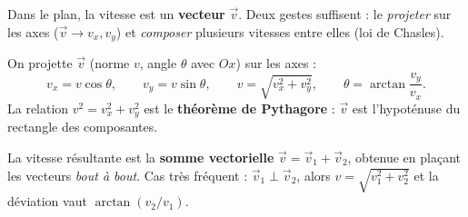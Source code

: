 \documentclass[11pt,a4paper]{article}
\newcommand{\vv}[1]{\vec{#1}}\newcommand{\ds}{\displaystyle}
\begin{document}

\noindent Dans le plan, la vitesse est un \textbf{vecteur} $\vv{v}$. Deux gestes suffisent :
le \emph{projeter} sur les axes ($\vv{v}\to v_x,v_y$) et \emph{composer} plusieurs vitesses
entre elles (loi de Chasles).

\begin{cle}
On projette $\vv{v}$ (norme $v$, angle $\theta$ avec $Ox$) sur les axes :
\[ v_x=v\cos\theta,\qquad v_y=v\sin\theta,\qquad v=\sqrt{v_x^{2}+v_y^{2}},\qquad \theta=\arctan\frac{v_y}{v_x}. \]
La relation $v^2=v_x^2+v_y^2$ est le \textbf{théorème de Pythagore} : $\vv{v}$ est l'hypoténuse du rectangle des composantes.
\begin{center}
\end{center}
\end{cle}

\begin{cle}
La vitesse résultante est la \textbf{somme vectorielle} $\vv{v}=\vv{v}_1+\vv{v}_2$, obtenue en
plaçant les vecteurs \emph{bout à bout}. Cas très fréquent : $\vv{v}_1\perp\vv{v}_2$, alors
$v=\sqrt{v_1^{2}+v_2^{2}}$ et la déviation vaut $\arctan(v_2/v_1)$.
\end{cle}
\end{document}
